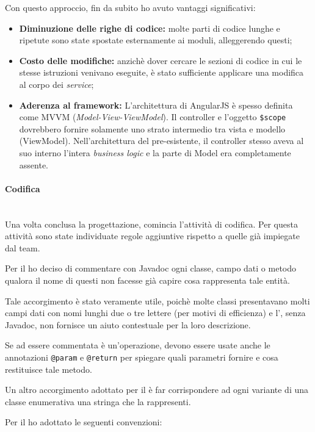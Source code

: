 Con questo approccio, fin da subito ho avuto vantaggi significativi:

\begin{itemize}
\item \textbf{Diminuzione delle righe di codice:} molte parti di codice lunghe
  e ripetute sono state spostate esternamente ai moduli, alleggerendo questi;
\item \textbf{Costo delle modifiche:} anzichè dover cercare le sezioni di
  codice in cui le stesse istruzioni venivano eseguite, è stato sufficiente
  applicare una modifica al corpo dei \emph{service};
\item \textbf{Aderenza al \gls{framework}:} L'architettura di AngularJS è
  spesso definita come MVVM (\emph{Model-View-ViewModel}). Il controller e
  l'oggetto \texttt{\$scope} dovrebbero fornire solamente uno strato
  intermedio tra vista e modello (ViewModel). Nell'architettura del \FREND{}
  pre-esistente, il controller stesso aveva al suo interno l'intera
  \emph{business logic} e la parte di Model era completamente assente.
\end{itemize}

\paragraph{Codifica} \mbox{} \\

Una volta conclusa la progettazione, comincia l'attività di codifica. Per
questa attività sono state individuate regole aggiuntive rispetto a quelle già
impiegate dal team.

Per il \BKEND{} ho deciso di commentare con Javadoc ogni classe, campo dati o
metodo qualora il nome di questi non facesse già capire cosa rappresenta tale
entità.

Tale accorgimento è stato veramente utile, poichè molte classi presentavano
molti campi dati con nomi lunghi due o tre lettere (per motivi di efficienza)
e l', senza Javadoc, non fornisce un aiuto contestuale per la loro
descrizione.

Se ad essere commentata è un'operazione, devono essere usate anche le
annotazioni \texttt{@param} e \texttt{@return} per spiegare quali parametri
fornire e cosa restituisce tale metodo.

Un altro accorgimento adottato per il \BKEND{} è far corrispondere ad ogni
variante di una classe enumerativa una stringa che la rappresenti.

Per il \FREND{} ho adottato le seguenti convenzioni:

